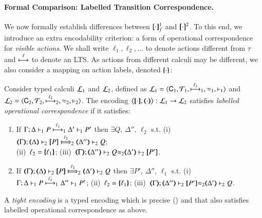 \documentclass[runningheads]{llncs}
\begin{document}
{\paragraph{Formal Comparison: Labelled Transition Correspondence.}
We now formally establish differences between $\map{\cdot}_f^1$ and $\pmap{\cdot}{2}$.
To this end, 
we introduce an extra encodability criterion: a form of operational correspondence 
for \emph{visible actions}. 
We shall write $\ell_1, \ell_2, \ldots$ to denote  
actions different from $\tau$
and  $\hby{\ell}$ to denote an LTS.
As actions from different calculi may be different, we also consider a mapping 
on action labels, denoted $\mapa{\cdot}$: 

\begin{definition}%
\label{def:lopco}
       Consider typed calculi $\tyl{L}_1$ and  $\tyl{L}_2$, defined as 
        $\tyl{L}_1=\calc{\CAL_1}{{\cal{T}}_1}{\hby{{\ell_1}}_1}{\wb_1}{\proves_1}$
       and $\tyl{L}_2=\calc{\CAL_2}{{\cal{T}}_2}{\hby{{\ell_2}}_2}{\wb_2}{\proves_2}$.
The encoding $\enco{\map{\cdot}, \mapt{\cdot}}: \tyl{L}_1 \to \tyl{L}_2$ satisfies
\emph{labelled operational correspondence}
if it satisfies:
	\begin{enumerate}[1.]
			\item
					If		$\stytraargi{\Gamma}{\ell_1}{\Delta}{P}{\Delta'}{P'}{1}{1}$
					then	$\exists Q$, $\Delta''$, $\ell_2$ s.t. 
							(i)~$\wtytraargi{\mapt{\Gamma}}{\ell_2}{\mapt{\Delta}}{\map{P}}{\mapt{\Delta''}}{Q}{2}{2}$;  \\
							(ii)~$\ell_2 = \mapa{\ell_1}$; 
							(iii)~${\mapt{\Gamma}};{\mapt{\Delta''}}\proves_2 {Q}{\wb_2}{\mapt{\Delta'}}\proves_2 {\map{P'}}$.
				
			\item
					If		$\wtytraargi{\mapt{\Gamma}}{\ell_2}{\mapt{\Delta}}{\map{P}}{\mapt{\Delta'}}{Q}{2}{2}$
					then	$\exists P'$, $\Delta''$, $\ell_1$ s.t. 
							(i)~$\stytraargi{\Gamma}{\ell_1}{\Delta}{P}{\Delta''}{P'}{1}{1}$;
							(ii)~$\ell_2 = \mapa{\ell_1}$;
							(iii)~${\mapt{\Gamma}};{\mapt{\Delta''}}\proves_2 {\map{P'}}{\wb_2}{\mapt{\Delta'}}\proves_2 {Q}$.
	\end{enumerate}
A \emph{tight encoding} is a typed 
encoding 
which is precise () and that also satisfies 
labelled operational correspondence as above.
\end{definition}

}
\end{document}
